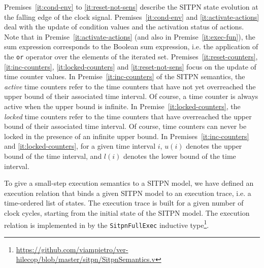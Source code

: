 Premises~\ref{it:cond-env} to \ref{it:reset-not-sens} describe the
SITPN state evolution at the falling edge of the clock
signal. Premises~\ref{it:cond-env} and \ref{it:activate-actions} deal
with the update of condition values and the activation status of
actions. Note that in Premise~\ref{it:activate-actions} (and also in
Premise~\ref{it:exec-fun}), the sum expression corresponds to the
Boolean sum expression, i.e. the application of the \texttt{or}
operator over the elements of the iterated
set. Premises~\ref{it:reset-counters}, \ref{it:inc-counters},
\ref{it:locked-counters} and \ref{it:reset-not-sens} focus on the
update of time counter values.  In Premise~\ref{it:inc-counters} of
the SITPN semantics, the \emph{active} time counters refer to the time
counters that have not yet overreached the upper bound of their
associated time interval. Of course, a time counter is always active
when the upper bound is infinite. In Premise~\ref{it:locked-counters},
the \emph{locked} time counters refer to the time counters that have
overreached the upper bound of their associated time interval. Of
course, time counters can never be locked in the presence of an
infinite upper bound. In Premises~\ref{it:inc-counters} and
\ref{it:locked-counters}, for a given time interval $i$, $u(i)$
denotes the upper bound of the time interval, and $l(i)$ denotes the
lower bound of the time interval.\\


To give a small-step execution semantics to a SITPN model, we have
defined an execution relation that binds a given SITPN model to an
execution trace, i.e. a time-ordered list of states. The execution
trace is built for a given number of clock cycles, starting from the
initial state of the SITPN model. The execution relation is
implemented in \coq{} by the \texttt{SitpnFullExec} inductive
type\footnote{\url{https://github.com/viampietro/ver-hilecop/blob/master/sitpn/SitpnSemantics.v}}.




